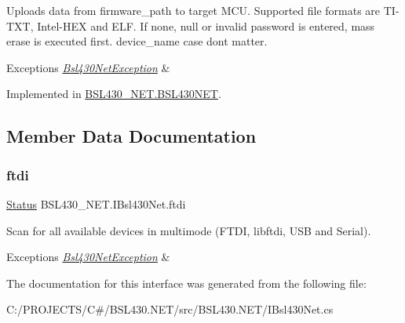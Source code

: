 Uploads data from firmware\+\_\+path to target M\+CU. Supported file formats are T\+I-\/\+T\+XT, Intel-\/\+H\+EX and E\+LF. If none, null or invalid password is entered, mass erase is executed first. device\+\_\+name case dont matter. 


\begin{DoxyExceptions}{Exceptions}
{\em \mbox{\hyperlink{class_b_s_l430___n_e_t_1_1_bsl430_net_exception}{Bsl430\+Net\+Exception}}} & \\
\hline
\end{DoxyExceptions}


Implemented in \mbox{\hyperlink{class_b_s_l430___n_e_t_1_1_b_s_l430_n_e_t_a34ea55282fe44a886e4382caf4e391fc}{B\+S\+L430\+\_\+\+N\+E\+T.\+B\+S\+L430\+N\+ET}}.



\subsection{Member Data Documentation}
\mbox{\label{interface_b_s_l430___n_e_t_1_1_i_bsl430_net_a2edaa235290e3b3b5551db0a60bc0781}} 
\subsubsection{\texorpdfstring{ftdi}{ftdi}}
{\footnotesize\ttfamily \mbox{\hyperlink{class_b_s_l430___n_e_t_1_1_status}{Status}} B\+S\+L430\+\_\+\+N\+E\+T.\+I\+Bsl430\+Net.\+ftdi}



Scan for all available devices in multimode (F\+T\+DI, libftdi, U\+SB and Serial). 


\begin{DoxyExceptions}{Exceptions}
{\em \mbox{\hyperlink{class_b_s_l430___n_e_t_1_1_bsl430_net_exception}{Bsl430\+Net\+Exception}}} & \\
\hline
\end{DoxyExceptions}


The documentation for this interface was generated from the following file\+:\begin{DoxyCompactItemize}
\item 
C\+:/\+P\+R\+O\+J\+E\+C\+T\+S/\+C\#/\+B\+S\+L430.\+N\+E\+T/src/\+B\+S\+L430.\+N\+E\+T/I\+Bsl430\+Net.\+cs\end{DoxyCompactItemize}
